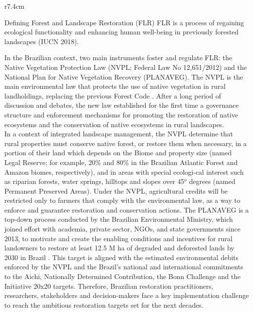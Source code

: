 \begin{wrapfigure}[9]{r}{7.4cm}
\begin{mybox}{Defining  Forest and Landscape Restoration (FLR)}
\label{Box1}
FLR is a process of regaining ecological functionality and enhancing human well-being in previously forested landscapes (IUCN 2018).
\end{mybox}
\end{wrapfigure}
%
In the Brazilian context, two main instruments foster and regulate FLR: the Native Vegetation Protection Law (NVPL; Federal Law No 12,651/2012) and the National Plan for Native Vegetation Recovery (PLANAVEG). The NVPL is the main environmental law that protects the use of native vegetation in rural landholdings, replacing the previous Forest Code \citep{Soares-filho2014}. After a long period of discussion and debates, the new law established for the first time a governance structure and enforcement mechanisms for promoting the restoration of native ecosystems and the conservation of native ecosystems in rural landscapes. \\
\indent In a context of integrated landscape management, the NVPL determine that rural properties must conserve native forest, or restore them when necessary, in a portion of their land which depends on the Biome and property size (named Legal Reserve; for example, 20\% and 80\% in the Brazilian Atlantic Forest and Amazon biomes, respectively), and in areas with special ecologi-cal interest such as riparian forests, water springs, hilltops and slopes over 45$^{o}$ degrees (named Permanent Preserved Areas). Under the NVPL, agricultural credits will be restricted only to farmers that comply with the environmental law, as a way to enforce and guarantee restoration and conservation actions. The PLANAVEG is a top-down process conducted by the Brazilian Environmental Ministry, which joined effort with academia, private sector, NGOs, and state governments since 2013, to motivate and create the enabling conditions and incentives for rural landowners to restore at least 12.5 M ha of degraded and deforested lands by 2030 in Brazil \citep{Brasil2017}. This target is aligned with the estimated environmental debits enforced by the NVPL and the Brazil’s national and international commitments to the Aichi, Nationally Determined Contribution, the Bonn Challenge and the Initiative 20x20 targets. Therefore, Brazilian restoration practitioners, researchers, stakeholders and decision-makers face a key implementation challenge to reach the ambitious restoration targets set for the next decades.\\
